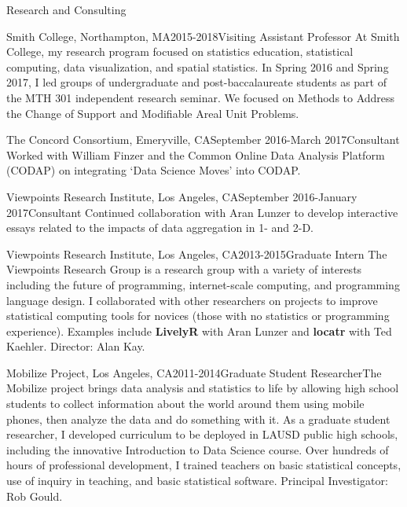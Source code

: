 \documentclass{resume} %
\begin{document}
\begin{rSection}{Research and Consulting}
\begin{pSubsection}{Smith College, }{Northampton, MA}{2015-2018}{Visiting Assistant Professor}
{At Smith College, my research program focused on statistics education, statistical computing, data visualization, and spatial statistics. In Spring 2016 and Spring 2017, I led groups of undergraduate and post-baccalaureate students as part of the MTH 301 independent research seminar. We focused on Methods to Address the Change of Support and Modifiable Areal Unit Problems.}
\end{pSubsection}


\begin{pSubsection}{The Concord Consortium, }{Emeryville, CA}{September 2016-March 2017}{Consultant}
{Worked with William Finzer and the Common Online Data Analysis Platform (CODAP) on integrating `Data Science Moves' into CODAP.}
\end{pSubsection}

\clearpage

\begin{pSubsection}{Viewpoints Research Institute, }{Los Angeles, CA}{September 2016-January 2017}{Consultant}
{Continued collaboration with Aran Lunzer to develop interactive essays related to the impacts of data aggregation in 1- and 2-D.}
\end{pSubsection}

\begin{pSubsection}{Viewpoints Research Institute, }{Los Angeles, CA}{2013-2015}{Graduate Intern}
{The Viewpoints Research Group is a research group with a variety of interests including the future of programming, internet-scale computing, and programming language design. I collaborated with other researchers on projects to improve statistical computing tools for novices (those with no statistics or programming experience). Examples include \textbf{LivelyR} with Aran Lunzer and \textbf{locatr} with Ted Kaehler. Director: Alan Kay.}
\end{pSubsection}

\begin{pSubsection}{Mobilize Project, }{Los Angeles, CA}{2011-2014}{Graduate Student Researcher}{The Mobilize project brings data analysis and statistics to life by allowing high school students to collect information about the world around them using mobile phones, then analyze the data and do something with it. As a graduate student researcher, I developed curriculum to be deployed in LAUSD public high schools, including the innovative Introduction to Data Science course. Over hundreds of hours of professional development, I trained teachers on basic statistical concepts, use of inquiry in teaching, and basic statistical software. Principal Investigator: Rob Gould.}
\end{pSubsection}
\end{rSection}
\end{document}
